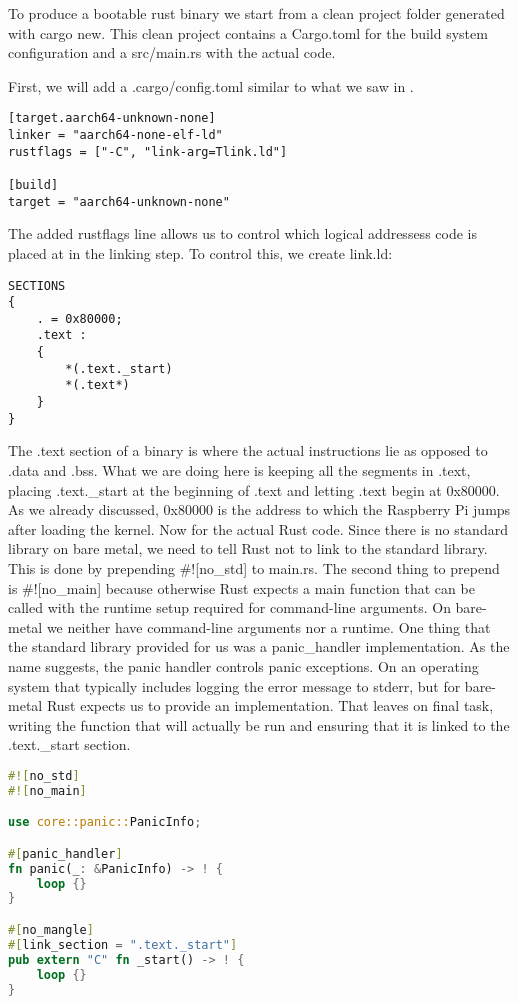 To produce a bootable rust binary we start from a clean project folder generated with cargo new.
This clean project contains a Cargo.toml for the build system configuration and a src/main.rs with the actual code.

First, we will add a .cargo/config.toml similar to what we saw in .
\begin{lstlisting}
[target.aarch64-unknown-none]
linker = "aarch64-none-elf-ld"
rustflags = ["-C", "link-arg=Tlink.ld"]
    
[build]
target = "aarch64-unknown-none"
\end{lstlisting}
The added rustflags line allows us to control which logical addressess code is placed at in the linking step.
To control this, we create link.ld:
\begin{lstlisting}
SECTIONS
{
    . = 0x80000;
    .text :
    {
        *(.text._start)
        *(.text*)
    }
}
\end{lstlisting}
The .text section of a binary is where the actual instructions lie as opposed to .data and .bss.
What we are doing here is keeping all the segments in .text, placing .text.\_start at the beginning of .text and letting .text begin at 0x80000.
As we already discussed, 0x80000 is the address to which the Raspberry Pi jumps after loading the kernel.
Now for the actual Rust code. Since there is no standard library on bare metal, we need to tell Rust not to link to the standard library.
This is done by prepending \#![no\_std] to main.rs.
The second thing to prepend is \#![no\_main] because otherwise Rust expects a main function that can be called with the runtime setup required for command-line arguments.
On bare-metal we neither have command-line arguments nor a runtime.
One thing that the standard library provided for us was a panic\_handler implementation.
As the name suggests, the panic handler controls panic exceptions.
On an operating system that typically includes logging the error message to stderr, but for bare-metal Rust expects us to provide an implementation.
That leaves on final task, writing the function that will actually be run and ensuring that it is linked to the .text.\_start section.
\begin{lstlisting}[language=Rust,style=colouredRust]
#![no_std]
#![no_main]

use core::panic::PanicInfo;

#[panic_handler]
fn panic(_: &PanicInfo) -> ! {
    loop {}
}

#[no_mangle]
#[link_section = ".text._start"]
pub extern "C" fn _start() -> ! {
	loop {}
}
\end{lstlisting}

